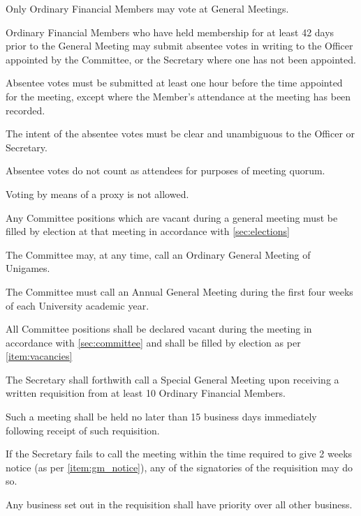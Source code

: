 \documentclass[a4paper]{article}
\begin{document}
\begin{myEnumerate}
    \item Only Ordinary Financial Members may vote at General Meetings.
        \begin{myEnumerate}
           \item Ordinary Financial Members who have held membership for at least 42 days prior to the General Meeting may submit absentee votes in writing to the Officer appointed by the Committee, or the Secretary where one has not been appointed.
                \begin{myEnumerate}
                    \item Absentee votes must be submitted at least one hour before the time appointed for the meeting, except where the Member’s attendance at the meeting has been recorded.
                    \item The intent of the absentee votes must be clear and unambiguous to the Officer or Secretary.
                \end{myEnumerate}
            \item Absentee votes do not count as attendees for purposes of meeting quorum.
            \item Voting by means of a proxy is not allowed.
        \end{myEnumerate}
    \item \label{item:vacancies} Any Committee positions which are vacant during a general meeting must be filled by election at that meeting in accordance with \cref{sec:elections}
    \item The Committee may, at any time, call an Ordinary General Meeting of Unigames.
    \item The Committee must call an Annual General Meeting during the first four weeks of each University academic year.
        \begin{myEnumerate}
            \item All Committee positions shall be declared vacant during the meeting in accordance with \cref{sec:committee} and shall be filled by election as per \cref{item:vacancies}
        \end{myEnumerate}
    \item The Secretary shall forthwith call a Special General Meeting upon receiving a written requisition from at least 10 Ordinary Financial Members.
        \begin{myEnumerate}
            \item Such a meeting shall be held no later than 15 business days immediately following receipt of such requisition.
                \begin{myEnumerate}
                    \item If the Secretary fails to call the meeting within the time required to give 2 weeks notice (as per \cref{item:gm_notice}), any of the signatories of the requisition may do so.
                \end{myEnumerate}
            \item \label{item:sgm_priority} Any business set out in the requisition shall have priority over all other business.
        \end{myEnumerate}
\end{myEnumerate}
\end{document}
